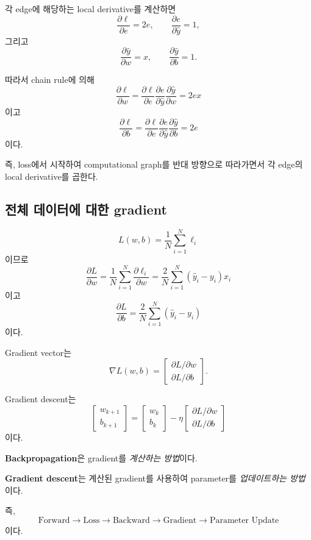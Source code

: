 \documentclass[11pt,a4paper]{article}
\newcommand{\grad}{\nabla}
\begin{document}
각 edge에 해당하는 local derivative를 계산하면
\[
\frac{\partial \ell}{\partial e}=2e,
\qquad
\frac{\partial e}{\partial \widehat y}=1,
\]
그리고
\[
\frac{\partial \widehat y}{\partial w}=x,
\qquad
\frac{\partial \widehat y}{\partial b}=1.
\]

따라서 chain rule에 의해
\[
\boxed{
\frac{\partial \ell}{\partial w}
=
\frac{\partial \ell}{\partial e}
\frac{\partial e}{\partial \widehat y}
\frac{\partial \widehat y}{\partial w}
=
2ex
}
\]
이고
\[
\boxed{
\frac{\partial \ell}{\partial b}
=
\frac{\partial \ell}{\partial e}
\frac{\partial e}{\partial \widehat y}
\frac{\partial \widehat y}{\partial b}
=
2e
}
\]
이다.

즉, loss에서 시작하여 computational graph를 반대 방향으로 따라가면서
각 edge의 local derivative를 곱한다.

\subsection{전체 데이터에 대한 gradient}

\[
L(w,b)=\frac1N\sum_{i=1}^N\ell_i
\]
이므로
\[
\frac{\partial L}{\partial w}
=
\frac1N\sum_{i=1}^N
\frac{\partial \ell_i}{\partial w}
=
\boxed{
\frac{2}{N}\sum_{i=1}^N(\widehat y_i-y_i)x_i
}
\]
이고
\[
\frac{\partial L}{\partial b}
=
\boxed{
\frac{2}{N}\sum_{i=1}^N(\widehat y_i-y_i)
}
\]
이다.

Gradient vector는
\[
\grad L(w,b)
=
\begin{bmatrix}
\partial L/\partial w\\[0.2em]
\partial L/\partial b
\end{bmatrix}.
\]

Gradient descent는
\[
\boxed{
\begin{bmatrix}
w_{k+1}\\ b_{k+1}
\end{bmatrix}
=
\begin{bmatrix}
w_k\\ b_k
\end{bmatrix}
-
\eta
\begin{bmatrix}
\partial L/\partial w\\
\partial L/\partial b
\end{bmatrix}
}
\]
이다.

\begin{keybox}
\textbf{Backpropagation}은 gradient를 \emph{계산하는 방법}이다.

\textbf{Gradient descent}는 계산된 gradient를 사용하여 parameter를 \emph{업데이트하는 방법}이다.

즉,
\[
\boxed{
\text{Forward}
\rightarrow
\text{Loss}
\rightarrow
\text{Backward}
\rightarrow
\text{Gradient}
\rightarrow
\text{Parameter Update}
}
\]
이다.
\end{keybox}
\end{document}
